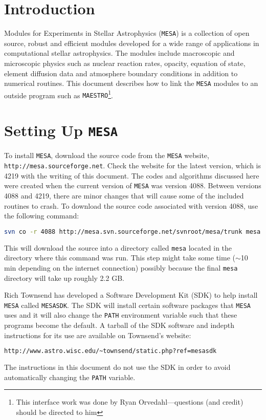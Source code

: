 
\section{Introduction}

Modules for Experiments in Stellar Astrophysics ({\tt MESA}) is a
collection of open source, robust and efficient modules developed for
a wide range of applications in computational stellar
astrophysics. The modules include macroscopic and microscopic physics
such as nuclear reaction rates, opacity, equation of state, element
diffusion data and atmosphere boundary conditions in addition to
numerical routines. This document describes how to link the {\tt MESA}
modules to an outside program such as {\tt MAESTRO}\footnote{This
  interface work was done by Ryan Orvedahl---questions (and credit)
  should be directed to him}.


\section{Setting Up {\tt MESA}}

To install {\tt MESA}, download the source code from the {\tt MESA} website, 
{\tt http://mesa.sourceforge.net}. Check the website for the latest version, 
which is 4219 with the writing of this document. The codes and algorithms 
discussed here were created when the current version of {\tt MESA} was 
version 4088. Between versions 4088 and 4219, there are minor changes that 
will cause some of the included routines to crash. To download the source code 
associated with version 4088, use the following command:
\begin{lstlisting}[language=bash,mathescape=false]
  svn co -r 4088 http://mesa.svn.sourceforge.net/svnroot/mesa/trunk mesa
\end{lstlisting}
This will download the source into a directory called {\tt mesa} located 
in the directory where this command was run. This step might take some time 
($\sim$10 min depending on the internet connection) possibly because the 
final {\tt mesa} directory will take up roughly 2.2 GB.

Rich Townsend has developed a Software Development Kit (SDK) to help install 
{\tt MESA} called {\tt MESASDK}. The SDK will install certain software 
packages that {\tt MESA} uses and it will also change the {\tt PATH} 
environment variable such that these programs become the default. A tarball 
of the SDK software and indepth instructions for its use are available on 
Townsend's website:
\begin{lstlisting}[language=html,mathescape=false]
  http://www.astro.wisc.edu/~townsend/static.php?ref=mesasdk
\end{lstlisting}
The instructions in this document do not use the SDK in order to avoid 
automatically changing the {\tt PATH} variable.

